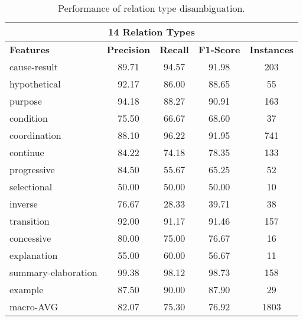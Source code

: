\begin{table}[ht]
\begin{tabular}{|l|c|c|c|c|}
\multicolumn{5}{|c|}{14 Relation Types}                                             \\ \hline
\bf Features            & \bf Precision & \bf Recall & \bf F1-Score & \bf Instances \\ \hline
    cause-result        &     89.71     &     94.57  &     91.98    &     203       \\ \hline
    hypothetical        &     92.17     &     86.00  &     88.65    &     55        \\ \hline
    purpose             &     94.18     &     88.27  &     90.91    &     163       \\ \hline
    condition           &     75.50     &     66.67  &     68.60    &     37        \\ \hline
    coordination        &     88.10     &     96.22  &     91.95    &     741       \\ \hline
    continue            &     84.22     &     74.18  &     78.35    &     133       \\ \hline
    progressive         &     84.50     &     55.67  &     65.25    &     52        \\ \hline
    selectional         &     50.00     &     50.00  &     50.00    &     10        \\ \hline
    inverse             &     76.67     &     28.33  &     39.71    &     38        \\ \hline
    transition          &     92.00     &     91.17  &     91.46    &     157       \\ \hline
    concessive          &     80.00     &     75.00  &     76.67    &     16        \\ \hline
    explanation         &     55.00     &     60.00  &     56.67    &     11        \\ \hline
    summary-elaboration &     99.38     &     98.12  &     98.73    &     158       \\ \hline
    example             &     87.50     &     90.00  &     87.90    &     29        \\ \hline
    macro-AVG           &     82.07     &     75.30  &     76.92    &     1803      \\ \hline

\end{tabular}
\caption{\label{t:sense-types} Performance of relation type
disambiguation. }
\end{table}
